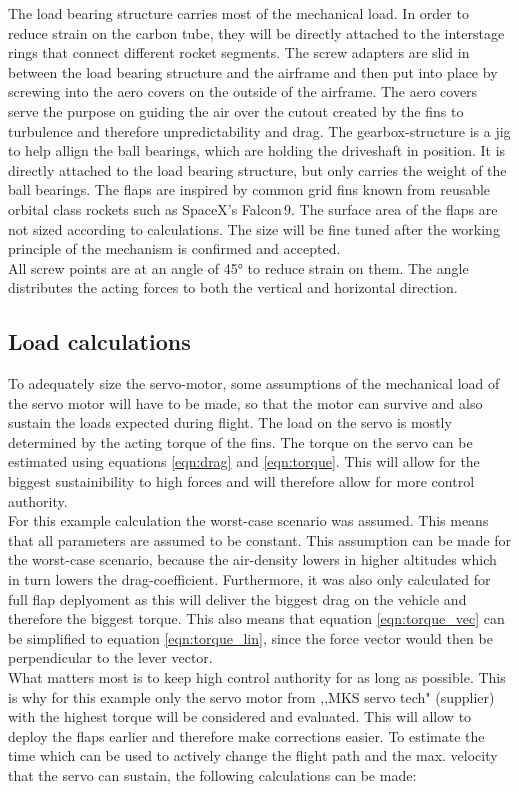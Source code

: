 \documentclass[fontsize=11pt,%
twoside,%
BCOR          = 8mm, %
DIV           = 11,  %
titlepage     = off,%
index=totoc,%
xcolor        = pdftex,%
dvipsnames,%
bibliography  = totoc,%
bibliography = numbered, %
listof        = notnumbered]{scrreprt}
\begin{document}
The load bearing structure carries most of the mechanical load. In order to reduce strain on the carbon tube, they will be directly attached to the interstage rings that connect different rocket segments. The screw adapters are slid in between the load bearing structure and the airframe and then put into place by screwing into the aero covers on the outside of the airframe. The aero covers serve the purpose on guiding the air over the cutout created by the fins to turbulence and therefore unpredictability and drag. The gearbox-structure is a jig to help allign the ball bearings, which are holding the driveshaft in position. It is directly attached to the load bearing structure, but only carries the weight of the ball bearings. The flaps are inspired by common grid fins known from reusable orbital class rockets such as SpaceX's Falcon$\,9$. The surface area of the flaps are not sized according to calculations. The size will be fine tuned after the working principle of the mechanism is confirmed and accepted. \\
All screw points are at an angle of 45° to reduce strain on them. The angle distributes the acting forces to both the vertical and horizontal direction.

\subsection{Load calculations}
To adequately size the servo-motor, some assumptions of the mechanical load of the servo motor will have to be made, so that the motor can survive and also sustain the loads expected during flight. The load on the servo is mostly determined by the acting torque of the fins. The torque on the servo can be estimated using equations \ref{eqn:drag} and \ref{eqn:torque}. This will allow for the biggest sustainibility to high forces and will therefore allow for more control authority.\\
For this example calculation the worst-case scenario was assumed. This means that all parameters are assumed to be constant. This assumption can be made for the worst-case scenario, because the air-density lowers in higher altitudes which in turn lowers the drag-coefficient. Furthermore, it was also only calculated for full flap deplyoment as this will deliver the biggest drag on the vehicle and therefore the biggest torque. This also means that equation \ref{eqn:torque_vec} can be simplified to equation \ref{eqn:torque_lin}, since the force vector would then be perpendicular to the lever vector.\\
What matters most is to keep high control authority for as long as possible. This is why for this example only the servo motor from ,,MKS servo tech" (supplier) with the highest torque will be considered and evaluated. This will allow to deploy the flaps earlier and therefore make corrections easier. To estimate the time which can be used to actively change the flight path and the max. velocity that the servo can sustain, the following calculations can be made:
\end{document}
